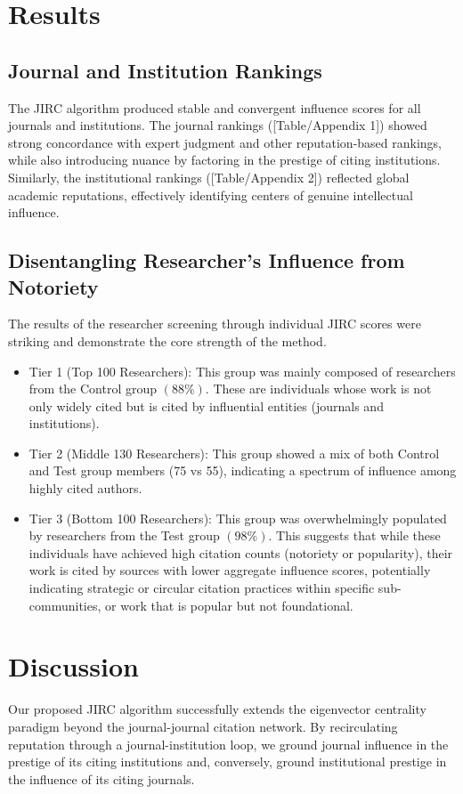 \documentclass[10pt]{article}
\begin{document}
\section{Results}
\subsection{Journal and Institution Rankings}
The JIRC algorithm produced stable and convergent influence scores for all journals and institutions. The journal rankings ([Table/Appendix 1]) showed strong concordance with expert judgment and other reputation-based rankings, while also introducing nuance by factoring in the prestige of citing institutions. Similarly, the institutional rankings ([Table/Appendix 2]) reflected global academic reputations, effectively identifying centers of genuine intellectual influence.
\subsection{Disentangling Researcher's Influence from Notoriety}
The results of the researcher screening through individual JIRC scores were striking and demonstrate the core strength of the method.
\begin{itemize}
\item Tier 1 (Top 100 Researchers): This group was mainly composed  of researchers from the Control group $(88\%)$. These are individuals whose work is not only widely cited but is cited by influential entities (journals and institutions).
\item Tier 2 (Middle 130 Researchers): This group showed a mix of both Control and Test group members (75 vs 55), indicating a spectrum of influence among highly cited authors.
\item Tier 3 (Bottom 100 Researchers): This group was overwhelmingly populated by researchers from the Test group $(98\%)$. This suggests that while these individuals have achieved high citation counts (notoriety or popularity), their work is cited by sources with lower aggregate influence scores, potentially indicating strategic or circular citation practices within specific sub-communities, or work that is popular but not foundational.
    \end{itemize}
\section{Discussion}

Our proposed JIRC algorithm successfully extends the eigenvector centrality paradigm beyond the journal-journal citation network. By recirculating reputation through a journal-institution loop, we ground journal influence in the prestige of its citing institutions and, conversely, ground institutional prestige in the influence of its citing journals.
\end{document}
